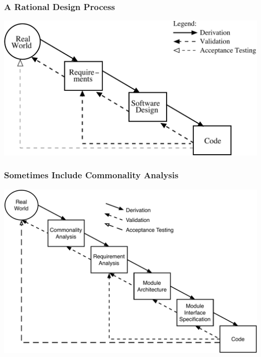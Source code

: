 \documentclass[t,12pt,numbers,fleqn]{beamer}
\begin{document}

\begin{frame}
\frametitle{A Rational Design Process}
\begin{center}
 \includegraphics[width=1.0\textwidth]{../Figures/reqSE.pdf}
\end{center}
\end{frame}


\begin{frame}
\frametitle{Sometimes Include Commonality Analysis}
\begin{center}
 \includegraphics[width=1.0\textwidth]{../Figures/Waterfall.pdf}
\end{center}
\end{frame}
\end{document}
